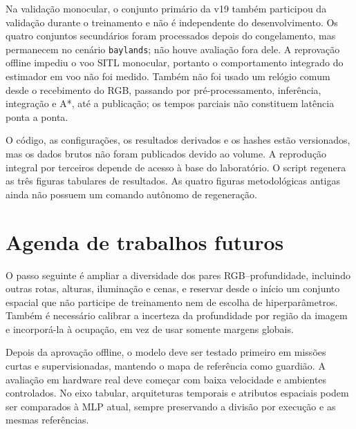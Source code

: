 Na validação monocular, o conjunto primário da v19 também participou da validação durante o treinamento e não é independente do desenvolvimento. Os quatro conjuntos secundários foram processados depois do congelamento, mas permanecem no cenário \texttt{baylands}; não houve avaliação fora dele. A reprovação offline impediu o voo SITL monocular, portanto o comportamento integrado do estimador em voo não foi medido. Também não foi usado um relógio comum desde o recebimento do RGB, passando por pré-processamento, inferência, integração e A*, até a publicação; os tempos parciais não constituem latência ponta a ponta.

O código, as configurações, os resultados derivados e os hashes estão versionados, mas os dados brutos não foram publicados devido ao volume. A reprodução integral por terceiros depende de acesso à base do laboratório. O script  regenera as três figuras tabulares de resultados. As quatro figuras metodológicas antigas ainda não possuem um comando autônomo de regeneração.

\section{Agenda de trabalhos futuros}

O passo seguinte é ampliar a diversidade dos pares RGB--profundidade, incluindo outras rotas, alturas, iluminação e cenas, e reservar desde o início um conjunto espacial que não participe de treinamento nem de escolha de hiperparâmetros. Também é necessário calibrar a incerteza da profundidade por região da imagem e incorporá-la à ocupação, em vez de usar somente margens globais.

Depois da aprovação offline, o modelo deve ser testado primeiro em missões curtas e supervisionadas, mantendo o mapa de referência como guardião. A avaliação em hardware real deve começar com baixa velocidade e ambientes controlados. No eixo tabular, arquiteturas temporais e atributos espaciais podem ser comparados à MLP atual, sempre preservando a divisão por execução e as mesmas referências.
